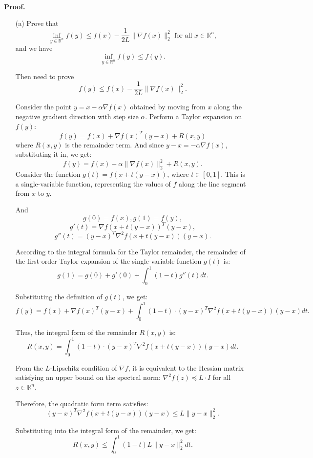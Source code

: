 \documentclass[a4paper, 11pt]{article}
\newenvironment{solution}
    {\textbf{Proof.}}
    {}
\begin{document}
\begin{solution}
		\begin{enumerate}
		\item[(a)] Prove that 
		$$ \inf_{y \in \mathbb{R}^n} f(y) \leq f(x) - \frac{1}{2L}\|\nabla f(x)\|_2^2 \text{ for all } x \in \mathbb{R}^n ,$$
		and we have
$$		
		 \inf_{y \in \mathbb{R}^n} f(y) \leq f(y).
 $$
 
	Then need to prove  $$f(y) \leq f(x) - \frac{1}{2L}\|\nabla f(x)\|_2^2  .$$

Consider the point \( y = x - \alpha \nabla f(x) \) obtained by moving from \( x \) along the negative gradient direction with step size \( \alpha \). Perform a Taylor expansion on \( f(y) \):
$$
 f(y) = f(x) + \nabla f(x)^T (y - x) + R(x, y) $$
where \( R(x, y) \) is the remainder term. And since \( y - x = -\alpha \nabla f(x) \), substituting it in, we get:
$$ 
f(y) = f(x) - \alpha \|\nabla f(x)\|_2^2 + R(x, y). 
$$
Consider the function \( g(t) = f(x + t(y - x)) \), where \( t \in [0, 1] \). This is a single-variable function, representing the values of \( f \) along the line segment from \( x \) to \( y \).  

And $$ g(0) = f(x) , g(1) = f(y) ,$$  
$$ g'(t) = \nabla f(x + t(y - x))^T (y - x) ,$$   
$$ g''(t) = (y - x)^T \nabla^2 f(x + t(y - x)) (y - x) .$$  

According to the integral formula for the Taylor remainder, the remainder of the first-order Taylor expansion of the single-variable function \( g(t) \) is:  
$$ g(1) = g(0) + g'(0) + \int_0^1 (1 - t) g''(t) dt.$$
	
Substituting the definition of \( g(t) \), we get:  
$$
f(y) = f(x) + \nabla f(x)^T (y - x) + \int_0^1 (1 - t) \cdot (y - x)^T \nabla^2 f(x + t(y - x)) (y - x) dt. 
$$ 
	
Thus, the integral form of the remainder \( R(x, y) \) is:  
$$
R(x, y) = \int_0^1 (1 - t) \cdot (y - x)^T \nabla^2 f(x + t(y - x)) (y - x) dt .
$$
 
From the \( L \)-Lipschitz condition of \( \nabla f \), it is equivalent to the Hessian matrix satisfying an upper bound on the spectral norm: \( \nabla^2 f(z) \preceq L \cdot I \) for all \( z \in \mathbb{R}^n \).  
	
Therefore, the quadratic form term satisfies: 
$$
(y - x)^T \nabla^2 f(x + t(y - x)) (y - x) \leq L \|y - x\|_2^2 . 
$$ 

Substituting into the integral form of the remainder, we get: 
$$ R(x, y) \leq \int_0^1 (1 - t) L \|y - x\|_2^2 dt. $$  
	

\end{enumerate}
\end{solution}
\end{document}
